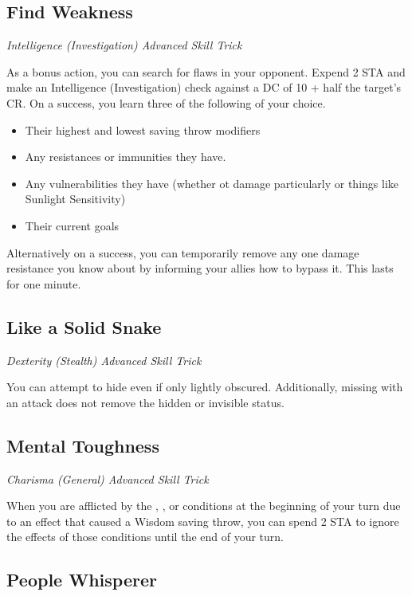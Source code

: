 \subsection{Find Weakness}

\textit{Intelligence (Investigation) Advanced Skill Trick}

As a bonus action, you can search for flaws in your opponent. Expend 2 STA and make an Intelligence (Investigation) check against a DC of 10 + half the target's CR. On a success, you learn three of the following of your choice.
\begin{itemize}
	\item Their highest and lowest saving throw modifiers
	\item Any resistances or immunities they have.
	\item Any vulnerabilities they have (whether ot damage particularly or things like Sunlight Sensitivity)
	\item Their current goals
\end{itemize}

Alternatively on a success, you can temporarily remove any one damage resistance you know about by informing your allies how to bypass it. This lasts for one minute.

\subsection{Like a Solid Snake}

\textit{Dexterity (Stealth) Advanced Skill Trick}

You can attempt to hide even if only lightly obscured. Additionally, missing with an attack does not remove the hidden or invisible status.

\subsection{Mental Toughness}

\textit{Charisma (General) Advanced Skill Trick}

When you are afflicted by the , , or  conditions at the beginning of your turn due to an effect that caused a Wisdom saving throw, you can spend 2 STA to ignore the effects of those conditions until the end of your turn.

\subsection{People Whisperer}

